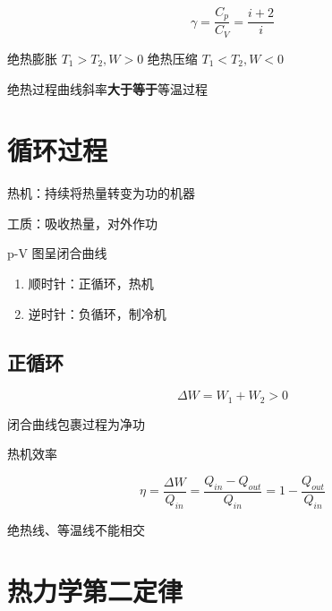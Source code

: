 \begin{enumerate}
          \begin{equation}
              \gamma{}=\frac{C_p}{C_V}=\frac{i+2}{i}
          \end{equation}

          绝热膨胀 $T_1>T_2,W>0$
          绝热压缩 $T_1<T_2,W<0$

          绝热过程曲线斜率\textbf{大于等于}等温过程

\end{enumerate}

\section{循环过程}

热机：持续将热量转变为功的机器

工质：吸收热量，对外作功

p-V 图呈闭合曲线

\begin{enumerate}
    \item 顺时针：正循环，热机
    \item 逆时针：负循环，制冷机
\end{enumerate}

\subsection{正循环}

\begin{equation}
    \Delta{W}=W_1+W_2>0
\end{equation}

闭合曲线包裹过程为净功

热机效率

\begin{equation}
    \eta=\frac{\Delta{W}}{Q_{in}}=\frac{Q_{in}-Q_{out}}{Q_{in}}=1-\frac{Q_{out}}{Q_{in}}
\end{equation}

绝热线、等温线不能相交

\section{热力学第二定律}


